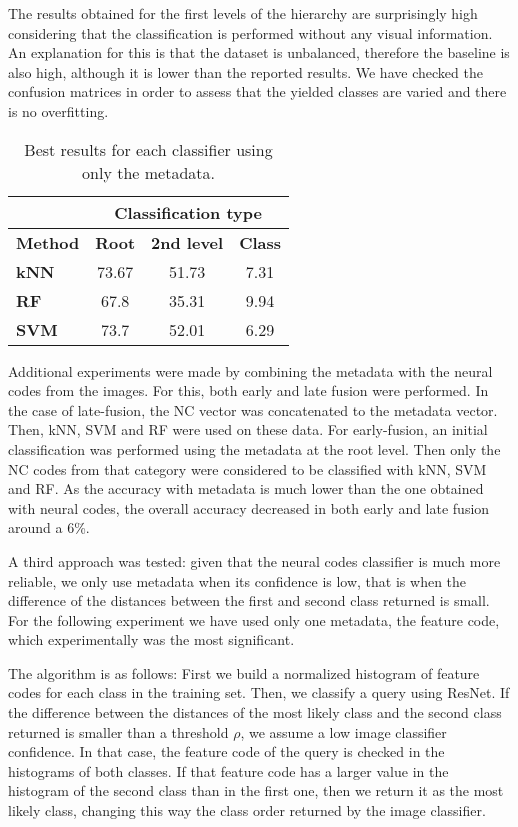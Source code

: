 \documentclass[final, twocolumn]{elsarticle}
\begin{document}
The results obtained for the first levels of the hierarchy are surprisingly high considering that the classification is performed without any visual information. An explanation for this is that the dataset is unbalanced, therefore the baseline is also high, although it is lower than the reported results. We have checked the confusion matrices in order to assess that the yielded classes are varied and there is no overfitting.


\begin{table}
\centering
\footnotesize
\begin{tabular}{lccc}
\hline
                & \multicolumn{3}{c}{\textbf{Classification type}}    \\ \hline
\textbf{Method} & \textbf{Root} & \textbf{2nd level} & \textbf{Class} \\ \hline
\textbf{kNN}    & 73.67         & 51.73              & 7.31           \\
\textbf{RF}     & 67.8          & 35.31              & 9.94           \\
\textbf{SVM}    & 73.7          & 52.01              & 6.29           \\ \hline
\end{tabular}
\caption{Best results for each classifier using only the metadata.}
\label{tab:metadata-results}
\end{table}


Additional experiments were made by combining the  metadata with the neural codes from the images. For this, both early and late fusion were performed. In the case of late-fusion, the NC vector was concatenated to the metadata vector. Then, kNN, SVM and RF were used on these data. For early-fusion, an initial classification was performed using the metadata at the root level. Then only the NC codes from that category were considered to be classified  with kNN, SVM and RF. As the accuracy with metadata is much lower than the one obtained with neural codes, the overall accuracy decreased in both early and late fusion around a 6\%.

A third approach was tested: given that the neural codes classifier is much more reliable, we only use metadata when its confidence is low, that is when the difference of the distances between the first and second class returned is small. For the following experiment we have used only one metadata, the feature code, which experimentally was the most significant.

The algorithm is as follows: First we build a normalized histogram of feature codes for each class in the training set. Then, we classify a query using ResNet. If the difference between the distances of the most likely class and the second class returned is smaller than a threshold $\rho$, we assume a low image classifier confidence. In that case, the feature code of the query is checked in the histograms of both classes. If that feature code has a larger value in the histogram of the second class than in the first one, then we return it as the most likely class, changing this way the class order returned by the image classifier.
\end{document}
